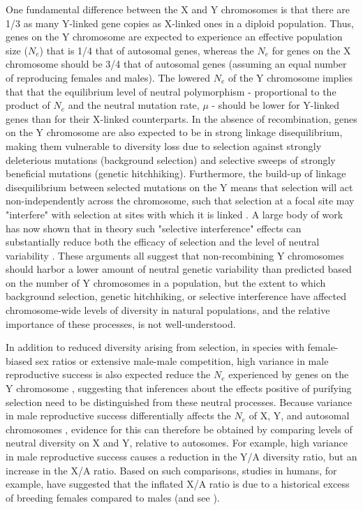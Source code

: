 \documentclass[9pt,twocolumn,twoside]{gsajnl}
\begin{document}
One fundamental difference between the X and Y chromosomes is that there are 1/3 as many Y-linked gene copies as X-linked ones in a diploid population. Thus, genes on the Y chromosome are expected to experience an effective population size ($N_{e}$) that is 1/4 that of autosomal genes, whereas the  $N_{e}$ for genes on the X chromosome should be 3/4 that of autosomal genes (assuming an equal number of reproducing females and males). The lowered $N_{e}$ of the Y chromosome implies that that the equilibrium level of neutral polymorphism - proportional to the product of $N_{e}$ and the neutral mutation rate, $\mu$ - should be lower for Y-linked genes than for their X-linked counterparts. In the absence of recombination, genes on the Y chromosome are also expected to be in strong linkage disequilibrium, making them vulnerable to diversity loss due to selection against strongly deleterious mutations (background selection) and selective sweeps of strongly beneficial mutations (genetic hitchhiking). Furthermore, the build-up of linkage disequilibrium between selected mutations on the Y means that selection will act non-independently across the chromosome, such that selection at a focal site may "interfere" with selection at sites with which it is linked \citep{hill1966HReffect}. A large body of work has now shown that in theory such "selective interference" effects can substantially reduce both the efficacy of selection and the level of neutral variability \citep{fisher1930genetical, muller1964relation, hill1966HReffect, mcvean2000,KaiserCharlesworth,good2014genetic}. These arguments all suggest that non-recombining Y chromosomes should harbor a lower amount of neutral genetic variability than predicted based on the number of Y chromosomes in a population, but the extent to which background selection, genetic hitchhiking, or selective interference have affected chromosome-wide levels of diversity in natural populations, and the relative importance of these processes, is not well-understood.

In addition to reduced diversity arising from selection, in species with female-biased sex ratios or extensive male-male competition, high variance in male reproductive success is also expected reduce the $N_{e}$ experienced by genes on the Y chromosome \citep{caballero1995,charlesworth2001,laporte2002,pool2007,ellegren2009}, suggesting that inferences about the effects positive of purifying selection need to be distinguished from these neutral processes. Because variance in male reproductive success differentially affects the $N_{e}$ of X, Y, and autosomal chromosomes \citep{kimura1964number,nomura2002effective}, evidence for this can therefore be obtained by comparing levels of neutral diversity on X and Y, relative to autosomes. For example, high variance in male reproductive success causes a reduction in the Y/A diversity ratio, but an increase in the X/A ratio. Based on such comparisons, studies in humans, for example, have suggested that the inflated X/A ratio is due to a historical excess of breeding females compared to males \citep{hammer2008sex} (and see \citep{bustamante2009,hammer2010,cotter2016genetic}).
\end{document}
